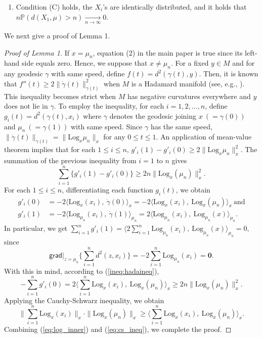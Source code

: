 \documentclass[preprint]{imsart}
\theoremstyle{plain}
\theoremstyle{remark}
\begin{document}
\begin{appendix}
\begin{enumerate}
  \item[(ii)] Condition (C) holds, the $X_i$'s are identically distributed, and it holds that $n\mathbb{P}(d(X_1, \mu) > n) \underset{n \to \infty}{\to} 0$.
\end{enumerate}

 

We next give a proof of Lemma 1. 

\begin{proof}[Proof of Lemma 1]
If $x=\mu_{n}$, equation (2) in the main paper is true since its left-hand side equals zero. Hence, we suppose that $x\neq \mu_n$. For a fixed $y \in M$ and for any geodesic $\gamma$ with same speed, define $f(t)=d^2(\gamma(t), y)$. Then, it is known that $f''(t) \ge 2\|\dot{\gamma}(t)\|^2_{\gamma(t)}$ when $M$ is a Hadamard manifold (see, e.g., \cite{do1992riemannian}). This inequality becomes strict when $M$ has negative curvatures everywhere and $y$ does not lie in $\gamma$. To employ the inequality, for each $i=1, 2, \ldots, n$, define $g_{i}(t) = d^2(\gamma(t), x_i)$ where $\gamma$ denotes the geodesic joining $x ~ (=\gamma(0))$ and $\mu_n ~(=\gamma(1))$ with same speed. Since $\gamma$ has the same speed, $\|\dot{\gamma}(t)\|_{\gamma(t)}=\|\mbox{Log}_{x}\mu_{n}\|_{x}$ for any $0\le t \le 1$. An application of mean-value theorem implies that for each $1\le i\le n$, $g'_i(1)-g'_i(0) \ge 2\|\mbox{Log}_{x}\mu_{n}\|^2_{x}$. The summation of the previous inequality from $i=1$ to $n$ gives
\begin{equation}\label{ineq:hadaineq}
\sum_{i=1}^{n} \{g'_{i}(1) - g'_{i}(0)\} \ge 2n\|\mbox{Log}_{x}(\mu_n) \|^2_{x}.
\end{equation}
For each $1\le i\le n$, differentiating each function $g_i(t)$, we obtain
\begin{align*}
g'_i(0)&= -2\langle\mbox{Log}_{x}(x_i),~ \dot{\gamma}(0) \rangle_{x}= -2\langle\mbox{Log}_{x}(x_i),~ \mbox{Log}_{x}(\mu_n)\rangle_{x}~ \mbox{and} \\
g'_{i}(1) &= -2\langle\mbox{Log}_{\mu_n}(x_i),~ \dot{\gamma}(1)\rangle_{\mu_n} = 2\langle\mbox{Log}_{\mu_n}(x_i),~ \mbox{Log}_{\mu_n}(x)\rangle_{\mu_n}. 
\end{align*}
In particular, we get $\sum_{i=1}^{n}g'_{i}(1)=\langle 2\sum_{i=1}^{n}\mbox{Log}_{\mu_n}(x_i),~ \mbox{Log}_{\mu_n}(x)\rangle_{\mu_n} = 0$, since $$\textsf{grad}|_{z=\mu_n}\{\sum_{i=1}^{n} d^2(z, x_i) \} = -2 \sum_{i=1}^{n} \mbox{Log}_{\mu_n}(x_i)=\textbf{0}.$$ With this in mind, according to (\ref{ineq:hadaineq}),
\begin{equation}\label{eq:log_inner}
-\sum_{i=1}^{n} g'_i(0)=2 \langle\sum_{i=1}^{n}\mbox{Log}_{x}(x_i),~ \mbox{Log}_{x}(\mu_{n}) \rangle_{x} \ge 2n\|\mbox{Log}_{x}(\mu_n) \|^2_{x}.
\end{equation}
Applying the Cauchy-Schwarz inequality, we obtain
\begin{equation}\label{eq:cs_ineq}
\|\sum_{i=1}^{n}\mbox{Log}_{x}(x_i) \|_{x} \cdot \|\mbox{Log}_{x}(\mu_n) \|_{x} \ge \langle \sum_{i=1}^{n}\mbox{Log}_{x}(x_i),~ \mbox{Log}_{x}(\mu_{n}) \rangle_{x}.
\end{equation}
Combining (\ref{eq:log_inner}) and (\ref{eq:cs_ineq}), we complete the proof. 


\end{proof}
\end{appendix}
\end{document}
